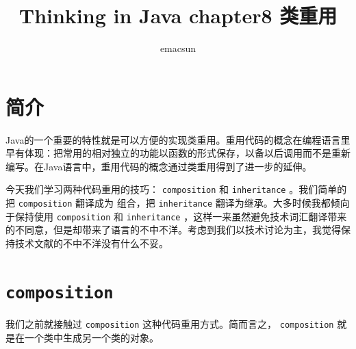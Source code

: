 \documentclass[10pt,a4paper,UTF8]{article}
\author{emacsun}
\date{}
\title{Thinking in Java chapter8 类重用}
\begin{document}
\maketitle
\tableofcontents
{}

\section{简介}
\label{sec:orgedcfd59}


Java的一个重要的特性就是可以方便的实现类重用。重用代码的概念在编程语言里早有体现：把常用的相对独立的功能以函数的形式保存，以备以后调用而不是重新编写。在Java语言中，重用代码的概念通过类重用得到了进一步的延伸。

今天我们学习两种代码重用的技巧： \texttt{composition} 和 \texttt{inheritance} 。我们简单的把 \texttt{composition} 翻译成为 组合，把 \texttt{inheritance} 翻译为继承。大多时候我都倾向于保持使用 \texttt{composition} 和 \texttt{inheritance} ，这样一来虽然避免技术词汇翻译带来的不同意，但是却带来了语言的不中不洋。考虑到我们以技术讨论为主，我觉得保持技术文献的不中不洋没有什么不妥。

\section{\texttt{composition}}
\label{sec:org4a9b159}


我们之前就接触过 \texttt{composition} 这种代码重用方式。简而言之， \texttt{composition} 就是在一个类中生成另一个类的对象。
\end{document}

